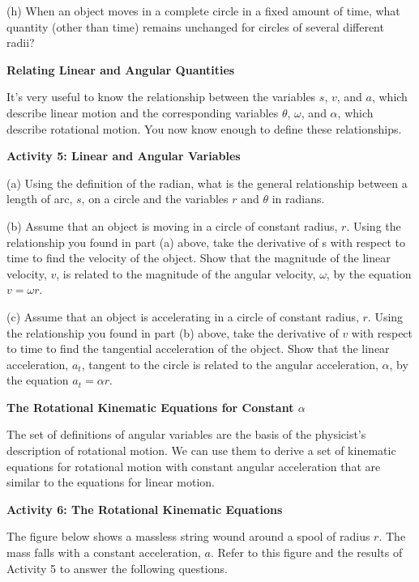 (h) When an object moves in a complete circle in a fixed amount of time, what
quantity (other than time) remains unchanged for circles of several different
radii? 
\vspace{10mm}

\textbf{Relating Linear and Angular Quantities} 

It's very useful to know the relationship between the variables 
$s$, $v$, and $a$,
which describe linear motion and the corresponding variables \( \theta  \),
\( \omega  \), and \( \alpha  \), which describe rotational motion. You now
know enough to define these relationships.

\textbf{Activity 5: Linear and Angular Variables }

(a) Using the definition of the radian, what is the general relationship between
a length of arc, $s$, on a circle and the variables 
$r$ and \( \theta  \) in radians. 
\vspace{10mm}

(b) Assume that an object is moving in a circle of constant radius, $r$. Using the relationship you found in part (a) above, take the derivative of s with respect to time to find the velocity of the object. Show that the magnitude of the linear velocity, $v$, is related to the magnitude of the angular velocity,
\( \omega  \), by the equation \(v =  \omega r \).
\vspace{20mm}

(c) Assume that an object is accelerating in a circle of constant radius, $r$.
Using the relationship you found in part (b) above, take the derivative of $v$ with respect to time to find the tangential acceleration of the object. Show that the linear acceleration, \( a_{t} \), tangent to the circle is related to the angular acceleration, \( \alpha  \), by the equation \( a_{t}  =  \alpha  r\).
\vspace{20mm}

\textbf{The Rotational Kinematic Equations for Constant \( \alpha  \) }

The set of definitions of angular variables are the basis of the physicist's
description of rotational motion. We can use them to derive a set of kinematic
equations for rotational motion with constant angular acceleration that are
similar to the equations for linear motion. 

\textbf{Activity 6: The Rotational Kinematic Equations }

The figure below shows a massless string wound around a spool of radius $r$.
The mass falls with a constant acceleration, $a$. Refer to this figure and the results of Activity 5 to answer the following questions.

